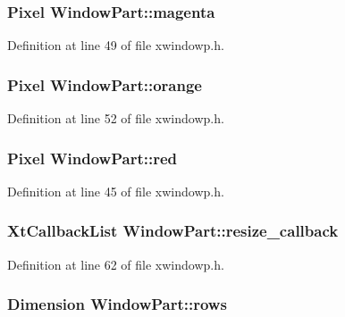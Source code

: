 \hypertarget{structWindowPart_ab156f6994a064eb0bb2732f925c85e1f}{
\subsubsection[{magenta}]{\setlength{\rightskip}{0pt plus 5cm}Pixel Window\+Part\+::magenta}}\label{structWindowPart_ab156f6994a064eb0bb2732f925c85e1f}


Definition at line 49 of file xwindowp.\+h.

\hypertarget{structWindowPart_a3544eaf79902d2f60d6a813efc8cca30}{
\subsubsection[{orange}]{\setlength{\rightskip}{0pt plus 5cm}Pixel Window\+Part\+::orange}}\label{structWindowPart_a3544eaf79902d2f60d6a813efc8cca30}


Definition at line 52 of file xwindowp.\+h.

\hypertarget{structWindowPart_a06fb532b433d74cbb1a57e7a5ce667b4}{
\subsubsection[{red}]{\setlength{\rightskip}{0pt plus 5cm}Pixel Window\+Part\+::red}}\label{structWindowPart_a06fb532b433d74cbb1a57e7a5ce667b4}


Definition at line 45 of file xwindowp.\+h.

\hypertarget{structWindowPart_a3901f202301b9598dc03caeebab9cab0}{
\subsubsection[{resize\+\_\+callback}]{\setlength{\rightskip}{0pt plus 5cm}Xt\+Callback\+List Window\+Part\+::resize\+\_\+callback}}\label{structWindowPart_a3901f202301b9598dc03caeebab9cab0}


Definition at line 62 of file xwindowp.\+h.

\hypertarget{structWindowPart_a4663a7f4178ce04f165cce9495bc7b82}{
\subsubsection[{rows}]{\setlength{\rightskip}{0pt plus 5cm}Dimension Window\+Part\+::rows}}\label{structWindowPart_a4663a7f4178ce04f165cce9495bc7b82}



